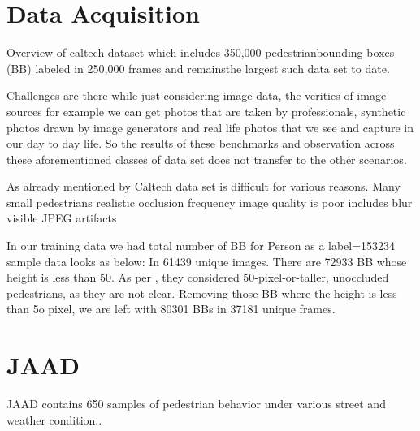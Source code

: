 %



\section{Data Acquisition}

Overview of caltech dataset
 \cite{dollar2011pedestrian}
which  includes   350,000  pedestrianbounding boxes (BB) labeled in 250,000 frames and remainsthe largest  such data  set to  date.

Challenges are there while just considering image data, 
the verities of image sources for example we can get photos that are taken by 
professionals, synthetic photos drawn by image generators and real life photos 
that we see and capture in our day to day life. So the results of these benchmarks and 
observation across these aforementioned classes of data set does not transfer to the other scenarios.

As already mentioned by \cite{walk2010new} Caltech data set is difficult for various reasons.
Many small pedestrians
realistic occlusion frequency
image quality is poor
includes blur
visible JPEG artifacts

\newpara
In our training data we had total number of BB for Person as a label=153234
sample data looks as below:
In 61439 unique images.
There are 72933 BB whose height is less than 50. As per \cite{walk2010new}, they considered 50-pixel-or-taller, unoccluded pedestrians, as they are not clear. Removing those BB where the height is less than 5o pixel, we are left with 80301 BBs in 37181 unique frames.


\section{JAAD}
\cite{rasouli2017agreeing} JAAD contains 650 samples of pedestrian behavior under various street and weather condition.. 
